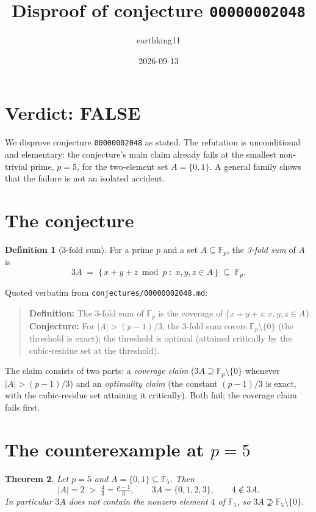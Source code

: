 \documentclass[11pt]{article}
\title{Disproof of conjecture \texttt{00000002048}}
\author{earthking11}
\date{2026-09-13}
\newtheorem{theorem}{Theorem}
\theoremstyle{definition}
\newtheorem{definition}[theorem]{Definition}
\theoremstyle{remark}
\newcommand{\F}{\mathbb{F}}
\begin{document}
\maketitle

\section*{Verdict: FALSE}

We disprove conjecture \texttt{00000002048} as stated. The refutation is
unconditional and elementary: the conjecture's main claim already fails at the
smallest non-trivial prime, $p = 5$, for the two-element set $A = \{0,1\}$. A
general family shows that the failure is not an isolated accident.

\section{The conjecture}

\begin{definition}[3-fold sum]
For a prime $p$ and a set $A \subseteq \F_p$, the \emph{3-fold sum} of $A$ is
\[
3A \;=\; \{\,x+y+z \bmod p \;:\; x, y, z \in A\,\} \;\subseteq\; \F_p .
\]
\end{definition}

Quoted verbatim from \texttt{conjectures/00000002048.md}:

\begin{quote}
\textbf{Definition:} The 3-fold sum of $\F_p$ is the coverage of
$\{x+y+z : x, y, z \in A\}$. \textbf{Conjecture:} For $|A| > (p-1)/3$, the
3-fold sum covers $\F_p \setminus \{0\}$ (the threshold is exact); the threshold
is optimal (attained critically by the cubic-residue set at the threshold).
\end{quote}

The claim consists of two parts: a \emph{coverage claim} ($3A \supseteq
\F_p \setminus \{0\}$ whenever $|A| > (p-1)/3$) and an \emph{optimality claim}
(the constant $(p-1)/3$ is exact, with the cubic-residue set attaining it
critically). Both fail; the coverage claim fails first.

\section{The counterexample at $p = 5$}

\begin{theorem}\label{thm:witness}
Let $p = 5$ and $A = \{0, 1\} \subseteq \F_5$. Then
\[
|A| = 2 \;>\; \tfrac{4}{3} = \tfrac{p-1}{3},
\qquad
3A = \{0, 1, 2, 3\},
\qquad
4 \notin 3A .
\]
In particular $3A$ does not contain the nonzero element $4$ of $\F_5$, so $3A
\not\supseteq \F_5 \setminus \{0\}$.
\end{theorem}
\end{document}
